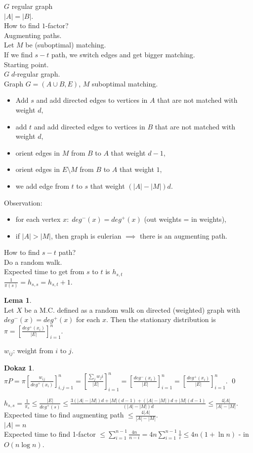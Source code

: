 \documentclass[a4paper, 12pt]{book}
\theoremstyle{definition}
\newtheorem{lemma}[counter]{Lema}
\newtheorem{pro}[counter]{Dokaz}
\theoremstyle{remark}
\begin{document}
$G$ regular graph \\
$|A| = |B|$. \\
How to find $1$-factor? \\
Augmenting paths. \\
Let $M$ be (suboptimal) matching. \\
If we find $s-t$ path, we switch edges and get bigger matching. \\
Starting point. \\
$G \; d$-regular graph. \\
Graph $G = (A \cup B, E)$, $M$ suboptimal matching.
\begin{itemize}
  \item Add $s$ and add directed edges to vertices in $A$ that are not matched with weight $d$,
  \item add $t$ and add directed edges to vertices in $B$ that are not matched with weight $d$,
  \item orient edges in $M$ from $B$ to $A$ that weight $d-1$,
  \item orient edges in $E \setminus M$ from $B$ to $A$ that weight $1$,
  \item we add edge from $t$ to $s$ that weight $(|A| - |M|) d$.
\end{itemize}
Observation:
\begin{itemize}
  \item for each vertex $x: \; deg^{-}(x) = deg^{+}(x)$ (out weights = in weights),
  \item if $|A| > |M|$, then graph is eulerian $\implies$ there is an augmenting path.
\end{itemize}
How to find $s-t$ path? \\
Do a random walk. \\
Expected time to get from $s$ to $t$ is $h_{s,t}$ \\
$\frac{1}{\pi(s)} = h_{s,s} = h_{s,t} + 1$.
\begin{lemma} \text{} \\
  Let $X$ be a M.C. defined as a random walk on directed (weighted) graph with $deg^{-}(x) = deg^{+}(x)$ for each $x$.
  Then the stationary distribution is $\pi = \left[\frac{deg^{+}(x_i)}{|E|}\right]_{i=1}^n$.
\end{lemma}
$w_{ij}$: weight from $i$ to $j$.
\begin{pro} \text{} \\
  $\pi P = \pi \left[\frac{w_{ij}}{deg^{+}(x_i)}\right]_{i,j=1}^n = \left[\frac{\sum_j w_ji}{|E|}\right]_{i=1}^n
  = \left[\frac{deg^{-}(x_i)}{|E|}\right]_{i=1}^n = \left[\frac{deg^{+}(x_i)}{|E|}\right]_{i=1}^n$.
  \qed
\end{pro}
$h_{s,s} = \frac{1}{\pi_s} \leq \frac{|E|}{deg^{+}(s)} 
\leq \frac{3(|A| - |M|) d + |M| (d-1) + (|A| - |M|) d + |M| (d-1)}{(|A| - |M|) d} \leq \frac{4 |A|}{|A| - |M|}$. \\
Expected time to find augmenting path $\leq \frac{4 |A|}{|A| - |M|}$. \\
$|A| = n$ \\
Expected time to find 1-factor $\leq \sum_{i=1}^{n-1} \frac{4n}{n-i} = 4n \sum_{i=1}^{n-1} \frac{1}{i} \leq 4n (1 + \ln n)$ -
in $O(n \log n)$.
\end{document}
